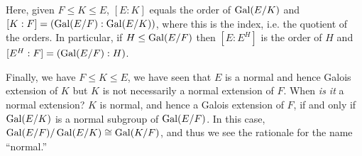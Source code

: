 \documentclass{../mathnotes}
\begin{document}
Here, given $F\leq K\leq E$, $[E:K]$ equals the order of $\operatorname{Gal}(E/K)$ and $[K:F]=\left( \operatorname{Gal}(E/F):\operatorname{Gal}(E/K) \right)$,
where this is the index, i.e. the quotient of the orders. In particular, if $H\leq\operatorname{Gal}(E/F)$ then $[E:E^H]$ is the order of $H$
and $[E^H:F]=\left( \operatorname{Gal}(E/F):H \right)$.

Finally, we have $F\leq K\leq E$, we have seen that $E$ is a normal and hence Galois extension of $K$ but
$K$ is not necessarily a normal extension of $F$. When \textit{is it} a normal extension? $K$ is normal, and hence a Galois
extension of $F$, if and only if $\operatorname{Gal}(E/K)$ is a normal subgroup of $\operatorname{Gal}(E/F)$. In this case, $\operatorname{Gal}(E/F)/\operatorname{Gal}(E/K)\cong\operatorname{Gal}(K/F)$,
and thus we see the rationale for the name ``normal.''
\end{document}
